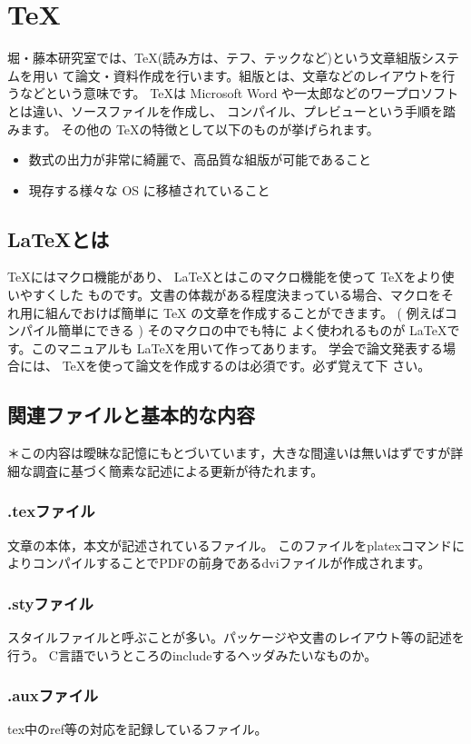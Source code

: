\documentclass[a4paper,10pt,twocolumn,fleqn]{jarticle}
\begin{document}
\section{\TeX}
堀・藤本研究室では、\TeX (読み方は、テフ、テックなど)という文章組版システムを用い
て論文・資料作成を行います。組版とは、文章などのレイアウトを行うなどという意味です。
\TeX は Microsoft Word や一太郎などのワープロソフトとは違い、ソースファイルを作成し、
コンパイル、プレビューという手順を踏みます。
その他の \TeX の特徴として以下のものが挙げられます。

\begin{itemize}
	\item  数式の出力が非常に綺麗で、高品質な組版が可能であること
	\item 現存する様々な OS に移植されていること
\end{itemize}

\subsection{\LaTeX とは}
\TeX にはマクロ機能があり、 \LaTeX とはこのマクロ機能を使って \TeX をより使いやすくした
ものです。文書の体裁がある程度決まっている場合、マクロをそれ用に組んでおけば簡単に \TeX
の文章を作成することができます。 ( 例えばコンパイル簡単にできる ) そのマクロの中でも特に
よく使われるものが \LaTeX です。このマニュアルも \LaTeX を用いて作ってあります。
学会で論文発表する場合には、 \TeX を使って論文を作成するのは必須です。必ず覚えて下
さい。

\subsection{関連ファイルと基本的な内容}
＊この内容は曖昧な記憶にもとづいています，大きな間違いは無いはずですが詳細な調査に基づく簡素な記述による更新が待たれます。
\subsubsection*{.texファイル}
文章の本体，本文が記述されているファイル。
このファイルをplatexコマンドによりコンパイルすることでPDFの前身であるdviファイルが作成されます。
\subsubsection*{.styファイル}
スタイルファイルと呼ぶことが多い。パッケージや文書のレイアウト等の記述を行う。
C言語でいうところのincludeするヘッダみたいなものか。
\subsubsection*{.auxファイル}
tex中のref等の対応を記録しているファイル。
\end{document}
